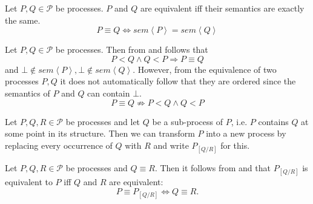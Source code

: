 \begin{definition}
\label{def:process_equivalence}
Let $P, Q \in \mathcal{P}$ be processes. $P$ and $Q$ are equivalent iff their semantics are exactly the same.
  \begin{equation}
    \label{eqn:equivalence}
    P \equiv Q \Leftrightarrow sem \left\langle P \right\rangle = sem \left\langle Q \right\rangle
  \end{equation}
  \hfill\qedsymbol
\end{definition}



\begin{corollary}
\label{crl:equivalence_ordered_processes}
Let $P, Q \in \mathcal{P}$ be processes. Then from  and  follows that
  \begin{equation}
    P < Q \wedge Q < P \Rightarrow P \equiv Q
  \end{equation}
  and $\bot \notin sem \left\langle P \right\rangle, \bot \notin sem \left\langle Q \right\rangle$. However, from the equivalence of two processes $P, Q$ it does not automatically follow that they are ordered since the semantics of $P$ and $Q$ can contain $\bot$.
  \begin{equation}
    P \equiv Q \not\Rightarrow P < Q \wedge Q < P
\end{equation}    
  \hfill\qedsymbol
\end{corollary}

\begin{definition}
\label{def:process_substitution}
Let $P, Q, R \in \mathcal{P}$ be processes and let $Q$ be a sub-process of $P$, i.e. $P$ contains $Q$ at some point in its structure. Then we can transform $P$ into a new process by replacing every occurrence of $Q$ with $R$ and write $P_{\left[ Q / R \right]}$ for this.

\hfill\qedsymbol
\end{definition}



\begin{corollary}
\label{crl:process_substitution}
Let $P, Q, R \in \mathcal{P}$ be processes and $Q \equiv R$. Then it follows from  and  that $P_{\left[ Q / R \right]}$ is equivalent to $P$ iff $Q$ and $R$ are equivalent:
  \begin{equation}
    P \equiv P_{\left[ Q / R \right]} \Leftrightarrow Q \equiv R.
  \end{equation}
  \hfill\qedsymbol
\end{corollary}

